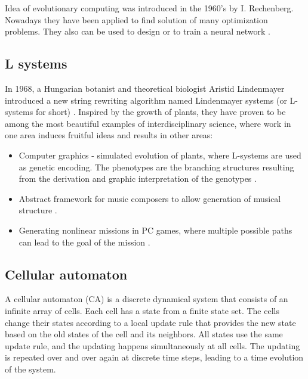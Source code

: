 Idea of evolutionary computing was introduced in the 1960's by I. Rechenberg. Nowadays they have been applied to find solution of many optimization problems. They also can be used to design or to train a neural network \cite{Montana:1989:TrainNeuronByGenetic}.


\subsection{L systems} %
\label{sub:l_systems}

In 1968, a Hungarian botanist and theoretical biologist Aristid Lindenmayer introduced a new string rewriting algorithm named Lindenmayer systems (or  L-systems for short) \cite{Lindenmayer68, Rozenberg12Lindenmayer}. Inspired by the growth of plants, they have proven to be among the most beautiful examples of interdisciplinary science, where work in one area induces fruitful ideas and results in other areas:
\begin{itemize}
  \item Computer graphics - simulated evolution of plants, where L-systems are used as genetic encoding. The phenotypes are the branching structures resulting from the derivation and graphic interpretation of the genotypes \cite{Ochoa98GeneticLSystems}.
  \item Abstract framework for music composers to allow generation of musical structure \cite{Manousakis06MusicalLSystems}.
  \item Generating nonlinear missions in PC games, where multiple possible paths can lead to the goal of the mission \cite{Togelius2016LSystemsLevels}.
\end{itemize}


\subsection{Cellular automaton} %
\label{sub:cellular_automaton}

A cellular automaton (CA) is a discrete dynamical system that consists of an infinite array of cells. Each cell has a state from a finite state set. The cells change their states according to a local update rule that provides the new state based on the old states of the cell and its neighbors. All states use the same update rule, and the updating happens simultaneously at all cells. The updating is repeated over and over again at discrete time steps, leading to a time evolution of the system.

